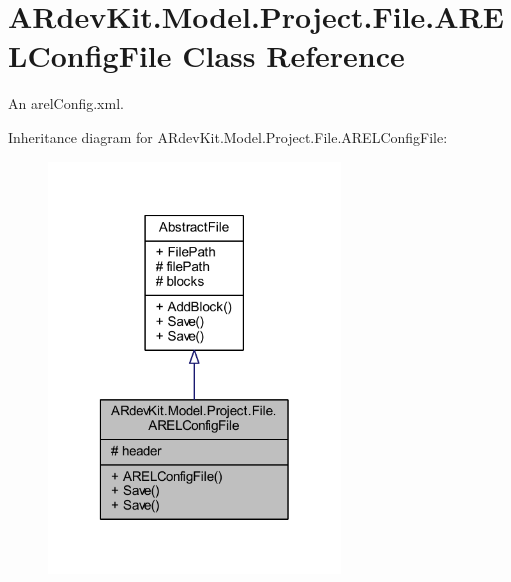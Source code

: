 \hypertarget{class_a_rdev_kit_1_1_model_1_1_project_1_1_file_1_1_a_r_e_l_config_file}{\section{A\-Rdev\-Kit.\-Model.\-Project.\-File.\-A\-R\-E\-L\-Config\-File Class Reference}
\label{class_a_rdev_kit_1_1_model_1_1_project_1_1_file_1_1_a_r_e_l_config_file}
}


An arel\-Config.\-xml.  




Inheritance diagram for A\-Rdev\-Kit.\-Model.\-Project.\-File.\-A\-R\-E\-L\-Config\-File\-:
\nopagebreak
\begin{figure}[H]
\begin{center}
\leavevmode
\includegraphics[width=220pt]{class_a_rdev_kit_1_1_model_1_1_project_1_1_file_1_1_a_r_e_l_config_file__inherit__graph}
\end{center}
\end{figure}


